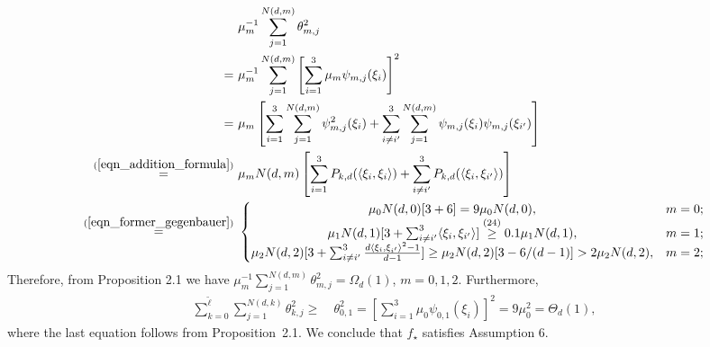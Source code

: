 \documentclass{article}
\theoremstyle{plain}
\theoremstyle{definition}
\theoremstyle{remark}
\newcommand{\dhnote}[1]{{\color{red}[#1]} } %
\begin{document}
\begin{appendix}
\begin{equation}\label{eqn_verify_assump_6_for_experiments}
    \begin{aligned}
    &~ \mu_{m}^{-1} \sum\limits_{j=1}^{N(d, m)}  \theta_{m,j}^{2}\\
    =&~ \mu_{m}^{-1} \sum\limits_{j=1}^{N(d, m)} \left[\sum_{i=1}^{3} \mu_{m} \psi_{m,j}(\xi_{i})\right]^2\\
    =&~ \mu_{m} \left[\sum_{i=1}^{3} \sum\limits_{j=1}^{N(d, m)} \psi_{m,j}^2(\xi_{i}) + \sum_{i \neq i^{\prime}}^{3} \sum\limits_{j=1}^{N(d, m)} \psi_{m,j}(\xi_{i}) \psi_{m,j}(\xi_{i^{\prime}}) \right]\\
    \overset{(\ref{eqn_addition_formula})}{=} &~ \mu_{m} N(d, m) \left[ \sum_{i=1}^{3} 
    P_{k, d}(\langle \xi_{i}, \xi_{i}\rangle) + \sum_{i \neq i^{\prime}}^{3} P_{k, d}(\langle \xi_{i}, \xi_{i^{\prime}}\rangle)\right]\\
    \overset{(\ref{eqn_former_gegenbauer})}{=}&~
    \left\{\begin{matrix}
\mu_{0} N(d, 0) [3+6] = 9 \mu_{0} N(d, 0), &  m=0;\\
\mu_{1} N(d, 1) [3 + \sum_{i \neq i^{\prime}}^{3} \langle \xi_{i}, \xi_{i^{\prime}}\rangle] \overset{(24)}{\geq} 0.1 \mu_{1} N(d, 1), &  m=1;\\
\mu_{2} N(d, 2) [3 + \sum_{i \neq i^{\prime}}^{3} \frac{d\langle \xi_{i}, \xi_{i^{\prime}}\rangle^2-1}{d-1}] \geq \mu_{2} N(d, 2) [3 - 6/(d-1)] > 2\mu_{2} N(d, 2), &  m=2;\\
\end{matrix}\right.
\end{aligned}
\end{equation}
Therefore, from Proposition 2.1 we have $\mu_{m}^{-1} \sum_{j=1}^{N(d, m)}  \theta_{m,j}^{2} = \Omega_d(1)$, $m=0, 1, 2$. 
Furthermore, 
\begin{align*}
    \sum\limits_{k=0}^{\tilde{\ell}} \sum\limits_{j =1}^{N(d, k)}  \theta_{k, j}^{2} \geq &~ \theta_{0, 1}^{2} = \left[\sum_{i=1}^{3} \mu_{0} \psi_{0,1}(\xi_{i})\right]^2 = 9\mu_0^2 =\Theta_d(1),
\end{align*}
where the last equation follows from Proposition~2.1. 
We conclude that $f_{\star}$ satisfies Assumption 6.




\end{appendix}
\end{document}
